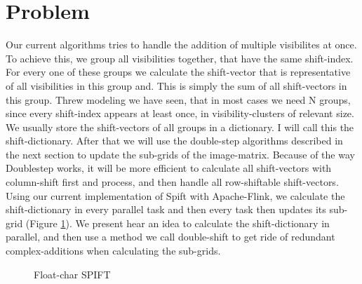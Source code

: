 \documentclass[12pt]{article}
\begin{document}
\maketitle

\section{Problem}
Our current algorithms tries to handle the addition of multiple visibilites at once. To achieve this, we group all visibilities together, that have the same shift-index. For every one of these groups we calculate the shift-vector that is representative of all visibilities in this group and. This is simply the sum of all shift-vectors in this group.
Threw modeling we have seen, that in most cases we need N groups, since every shift-index appears at least once, in visibility-clusters of relevant size. We usually store the shift-vectors of all groups in a dictionary. I will call this the shift-dictionary. After that we will use the double-step algorithms described in the next section to update the sub-grids of the image-matrix. Because of the way Doublestep works, it will be more efficient to calculate all shift-vectors with column-shift first and process, and then handle all row-shiftable shift-vectors. \\

Using our current implementation of Spift with Apache-Flink, we calculate the shift-dictionary in every parallel task and then every task then updates its sub-grid (Figure \ref{fig:floatSPIFT}). We present hear an idea to calculate the shift-dictionary in parallel, and then use a method we call double-shift to get ride of redundant complex-additions when calculating the sub-grids. \\

\begin{figure}

\caption{Float-char SPIFT}
\label{fig:floatSPIFT}
\end{figure}
\end{document}
